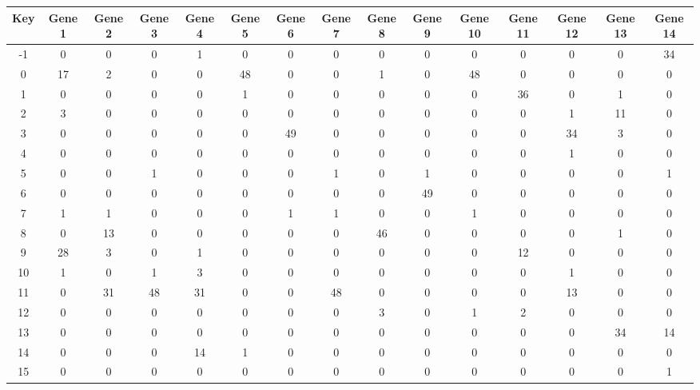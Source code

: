 \begin{tabular}{|c|c|c|c|c|c|c|c|c|c|c|c|c|c|c|}
\hline
Key & Gene 1 & Gene 2 & Gene 3 & Gene 4 & Gene 5 & Gene 6 & Gene 7 & Gene 8 & Gene 9 & Gene 10 & Gene 11 & Gene 12 & Gene 13 & Gene 14 \\
\hline
-1 & 0 & 0 & 0 & 1 & 0 & 0 & 0 & 0 & 0 & 0 & 0 & 0 & 0 & 34 \\
0 & 17 & 2 & 0 & 0 & 48 & 0 & 0 & 1 & 0 & 48 & 0 & 0 & 0 & 0 \\
1 & 0 & 0 & 0 & 0 & 1 & 0 & 0 & 0 & 0 & 0 & 36 & 0 & 1 & 0 \\
2 & 3 & 0 & 0 & 0 & 0 & 0 & 0 & 0 & 0 & 0 & 0 & 1 & 11 & 0 \\
3 & 0 & 0 & 0 & 0 & 0 & 49 & 0 & 0 & 0 & 0 & 0 & 34 & 3 & 0 \\
4 & 0 & 0 & 0 & 0 & 0 & 0 & 0 & 0 & 0 & 0 & 0 & 1 & 0 & 0 \\
5 & 0 & 0 & 1 & 0 & 0 & 0 & 1 & 0 & 1 & 0 & 0 & 0 & 0 & 1 \\
6 & 0 & 0 & 0 & 0 & 0 & 0 & 0 & 0 & 49 & 0 & 0 & 0 & 0 & 0 \\
7 & 1 & 1 & 0 & 0 & 0 & 1 & 1 & 0 & 0 & 1 & 0 & 0 & 0 & 0 \\
8 & 0 & 13 & 0 & 0 & 0 & 0 & 0 & 46 & 0 & 0 & 0 & 0 & 1 & 0 \\
9 & 28 & 3 & 0 & 1 & 0 & 0 & 0 & 0 & 0 & 0 & 12 & 0 & 0 & 0 \\
10 & 1 & 0 & 1 & 3 & 0 & 0 & 0 & 0 & 0 & 0 & 0 & 1 & 0 & 0 \\
11 & 0 & 31 & 48 & 31 & 0 & 0 & 48 & 0 & 0 & 0 & 0 & 13 & 0 & 0 \\
12 & 0 & 0 & 0 & 0 & 0 & 0 & 0 & 3 & 0 & 1 & 2 & 0 & 0 & 0 \\
13 & 0 & 0 & 0 & 0 & 0 & 0 & 0 & 0 & 0 & 0 & 0 & 0 & 34 & 14 \\
14 & 0 & 0 & 0 & 14 & 1 & 0 & 0 & 0 & 0 & 0 & 0 & 0 & 0 & 0 \\
15 & 0 & 0 & 0 & 0 & 0 & 0 & 0 & 0 & 0 & 0 & 0 & 0 & 0 & 1 \\
\hline
\end{tabular}